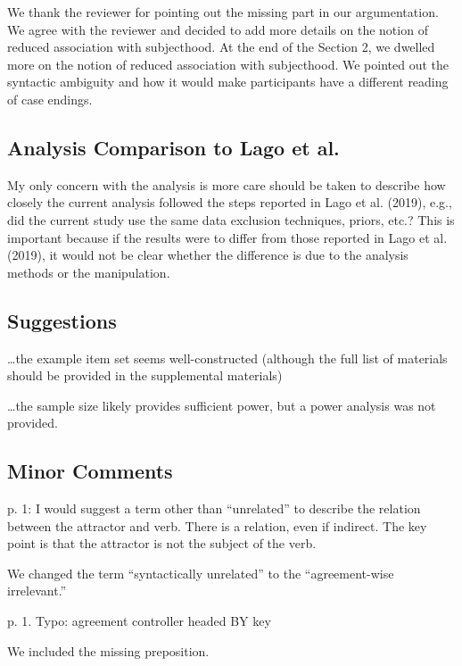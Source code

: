 \documentclass{response}
\begin{document}
\AR We thank the reviewer for pointing out the missing part in our argumentation. We agree with the reviewer and decided to add more details on the notion of reduced association with subjecthood. At the end of the Section 2, we dwelled more on the notion of reduced association with subjecthood. We pointed out the syntactic ambiguity and how it would make participants have a different reading of case endings.  

\subsection{Analysis Comparison to Lago et al.}

\RC My only concern with the analysis is more care should be taken to describe how closely the current analysis followed the steps reported in Lago et al. (2019), e.g., did the current study use the same data exclusion techniques, priors, etc.? This is important because if the results were to differ from those reported in Lago et al. (2019), it would not be clear whether the difference is due to the analysis methods or the manipulation. 

\AR 

\subsection{Suggestions}

\RC \ldots the example item set seems well-constructed (although the full list of materials should be provided in the supplemental materials)

\AR 

\RC \ldots the sample size likely provides sufficient power, but a power analysis was not provided.

\AR 

\subsection{Minor Comments}

\RC p. 1: I would suggest a term other than “unrelated” to describe the relation between the attractor and verb. There is a relation, even if indirect. The key point is that the attractor is not the subject of the verb. 

\AR We changed the term ``syntactically unrelated'' to the ``agreement-wise irrelevant.''

\RC p. 1. Typo: agreement controller headed BY key

\AR We included the missing preposition.
\end{document}
